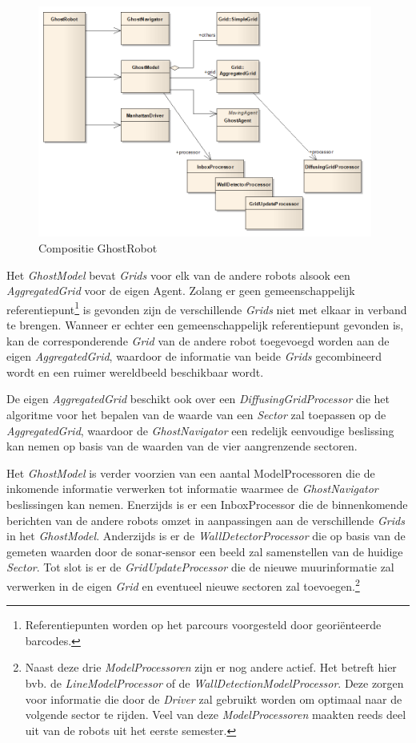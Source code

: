 \documentclass[12pt,a4paper]{report}
\begin{document}
\begin{figure}[htbp]
  \centering
  \includegraphics[width=110mm]{resources/ghostrobot.png}
  \caption{Compositie GhostRobot}
  \label{uml:ghostrobot}
\end{figure}

Het \emph{GhostModel} bevat \emph{Grids} voor elk van de andere robots alsook een \emph{AggregatedGrid} voor de eigen Agent. Zolang er geen gemeenschappelijk referentiepunt\footnote{Referentiepunten worden op het parcours voorgesteld door geori\"enteerde barcodes.} is gevonden zijn de verschillende \emph{Grids} niet met elkaar in verband te brengen. Wanneer er echter een gemeenschappelijk referentiepunt gevonden is, kan de corresponderende \emph{Grid} van de andere robot toegevoegd worden aan de eigen \emph{AggregatedGrid}, waardoor de informatie van beide \emph{Grids} gecombineerd wordt en een ruimer wereldbeeld beschikbaar wordt.

De eigen \emph{AggregatedGrid} beschikt ook over een \emph{DiffusingGridProcessor} die het algoritme voor het bepalen van de waarde van een \emph{Sector} zal toepassen op de \emph{AggregatedGrid}, waardoor de \emph{GhostNavigator} een redelijk eenvoudige beslissing kan nemen op basis van de waarden van de vier aangrenzende sectoren.

Het \emph{GhostModel} is verder voorzien van een aantal ModelProcessoren die de inkomende informatie verwerken tot informatie waarmee de \emph{GhostNavigator} beslissingen kan nemen. Enerzijds is er een InboxProcessor die de binnenkomende berichten van de andere robots omzet in aanpassingen aan de verschillende \emph{Grids} in het \emph{GhostModel}. Anderzijds is er de \emph{WallDetectorProcessor} die op basis van de gemeten waarden door de sonar-sensor een beeld zal samenstellen van de huidige \emph{Sector}. Tot slot is er de \emph{GridUpdateProcessor} die de nieuwe muurinformatie zal verwerken in de eigen \emph{Grid} en eventueel nieuwe sectoren zal toevoegen.\footnote{Naast deze drie \emph{ModelProcessoren} zijn er nog andere actief. Het betreft hier bvb. de \emph{LineModelProcessor} of de \emph{WallDetectionModelProcessor}. Deze zorgen voor informatie die door de \emph{Driver} zal gebruikt worden om optimaal naar de volgende sector te rijden. Veel van deze \emph{ModelProcessoren} maakten reeds deel uit van de robots uit het eerste semester.}
\end{document}
